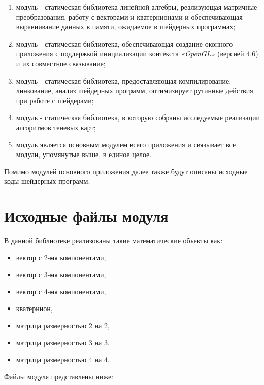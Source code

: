 \begin{enumerate}[label=\arabic*), labelsep=0.5em]
    \item модуль  - статическая библиотека линейной алгебры, реализующая
    матричные преобразования, работу с векторами и кватернионами и обеспечивающая
    выравнивание данных в памяти, ожидаемое в шейдерных программах;
    \item модуль  - статическая библиотека, обеспечивающая создание
    оконного приложения с поддержкой инициализации контекста \textit{«OpenGL»} (версией 4.6)
    и их совместное связывание;
    \item модуль  - статическая библиотека, предоставляющая компилирование, линкование,
    анализ шейдерных программ, оптимизирует рутинные действия при работе с шейдерами;
    \item модуль  - статическая библиотека, в которую собраны исследуемые реализации
    алгоритмов теневых карт;
    \item модуль  является основным модулем всего приложения и связывает все
    модули, упомянутые выше, в единое целое.
\end{enumerate}

Помимо модулей основного приложения далее также будут описаны исходные коды
шейдерных программ.

\section{Исходные файлы модуля }

В данной библиотеке реализованы такие математические объекты как:

\begin{itemize}[label=---]
    \item вектор с 2-мя компонентами,
    \item вектор с 3-мя компонентами,
    \item вектор с 4-мя компонентами,
    \item кватернион,
    \item матрица размерностью 2 на 2,
    \item матрица размерностью 3 на 3,
    \item матрица размерностью 4 на 4.
\end{itemize}

Файлы модуля представлены ниже:

